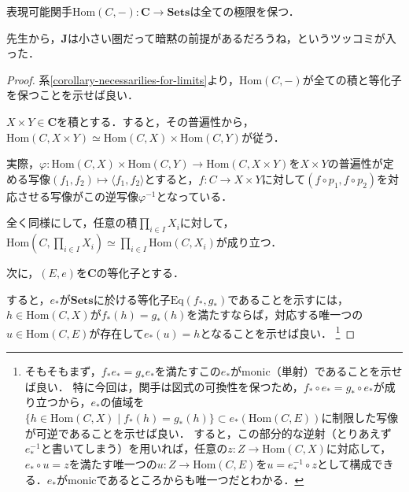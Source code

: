 \documentclass[uplatex, dvipdfmx]{jsarticle}
\begin{document}
\begin{proposition}
    表現可能関手$\mathrm{Hom}(C,-):\mathbf{C}\to\mathbf{Sets}$は全ての極限を保つ．
\end{proposition}
\begin{remark*}
    先生から，$\mathbf{J}$は小さい圏だって暗黙の前提があるだろうね，というツッコミが入った．
\end{remark*}
\begin{proof}
    系\ref{corollary-necessarilies-for-limits}より，$\mathrm{Hom}(C,-)$が全ての積と等化子を保つことを示せば良い．

    $X\times Y\in\mathbf{C}$を積とする．すると，その普遍性から，$\mathrm{Hom}(C,X\times Y)\simeq \mathrm{Hom}(C,X)\times\mathrm{Hom}(C,Y)$が従う．
    \begin{center}
    \end{center}
    実際，$\varphi:\mathrm{Hom}(C,X)\times\mathrm{Hom}(C,Y)\to\mathrm{Hom}(C,X\times Y)$を$X\times Y$の普遍性が定める写像$(f_1,f_2)\mapsto\langle f_1,f_2\rangle$とすると，$f:C\to X\times Y$に対して$(f\circ p_1,f\circ p_2)$を対応させる写像がこの逆写像$\varphi^{-1}$となっている．

    全く同様にして，任意の積$\prod_{i\in I}X_i$に対して，$\mathrm{Hom}(C,\prod_{i\in I}X_i)\simeq\prod_{i\in I}\mathrm{Hom}(C,X_i)$が成り立つ．

    次に，$(E,e)$を$\mathbf{C}$の等化子とする．
    \begin{center}
    \end{center}
    すると，$e_*$が$\mathbf{Sets}$に於ける等化子$\mathrm{Eq}(f_*,g_*)$であることを示すには，$h\in\mathrm{Hom}(C,X)$が$f_*(h)=g_*(h)$を満たすならば，対応する唯一つの$u\in\mathrm{Hom}(C,E)$が存在して$e_*(u)=h$となることを示せば良い．
    \footnote{そもそもまず，$f_*e_*=g_*e_*$を満たすこの$e_*$がmonic（単射）であることを示せば良い．
    特に今回は，関手は図式の可換性を保つため，$f_*\circ e_*=g_*\circ e_*$が成り立つから，$e_*$の値域を$\{ h\in\mathrm{Hom}(C,X)\mid f_*(h)=g_*(h) \}\subset e_*(\mathrm{Hom}(C,E))$に制限した写像が可逆であることを示せば良い．
    すると，この部分的な逆射（とりあえず$e_*^{-1}$と書いてしまう）を用いれば，任意の$z:Z\to\mathrm{Hom}(C,X)$に対応して，$e_*\circ u=z$を満たす唯一つの$u:Z\to\mathrm{Hom}(C,E)$を$u=e_*^{-1}\circ z$として構成できる．$e_*$がmonicであるところからも唯一つだとわかる．}


\end{proof}
\end{document}
